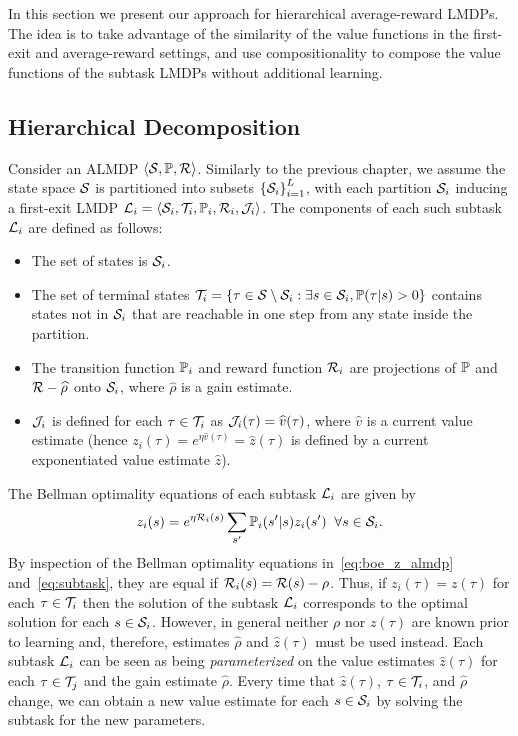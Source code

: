 In this section we present our approach for hierarchical average-reward LMDPs. The idea is to take advantage of the similarity of the value functions in the first-exit and average-reward settings, and use compositionality to compose the value functions of the subtask LMDPs without additional learning.

\subsection{Hierarchical Decomposition}
Consider an ALMDP $\langle\mathcal{S},\mathbb{P},\mathcal{R}\rangle$. Similarly to the previous chapter, we assume the state space $\mathcal{S}$ is partitioned into subsets $\left\{\mathcal{S}_i\right\}^L_{i=1}$, with each partition $\mathcal{S}_i$ inducing
a first-exit LMDP $\mathcal{L}_i = \langle\mathcal{S}_i, \mathcal{T}_i, \mathbb{P}_i, \mathcal{R}_i,\mathcal{J}_i\rangle$.
The components of each such subtask $\mathcal{L}_i$ are defined as follows:
\begin{itemize}
  \item The set of states is $\mathcal{S}_i$.
  \item The set of terminal states $\mathcal{T}_i=\{\tau\in\mathcal{S}\setminus\mathcal{S}_i: \exists s\in\mathcal{S}_i, \mathbb{P}(\tau|s)>0\}$ contains states not in $\mathcal{S}_i$ that are reachable in one step from any state inside the partition.
  \item The transition function $\mathbb{P}_i$ and reward function $\mathcal{R}_i$ are projections of $\mathbb{P}$ and $\mathcal{R}-\widehat\rho$ onto $\mathcal{S}_i$, where $\widehat\rho$ is a gain estimate.
  \item $\mathcal{J}_i$ is defined for each $\tau\in\mathcal{T}_i$ as $\mathcal{J}_i(\tau)=\widehat v(\tau)$, where $\widehat v$ is a current value estimate (hence $z_i(\tau)=e^{\eta\widehat v(\tau)} = \widehat z(\tau)$ is defined by a current exponentiated value estimate $\widehat z$).
\end{itemize}
The Bellman optimality equations of each subtask $\mathcal{L}_i$ are given by
\begin{equation}\label{eq:subtask}
  z_i(s) = e^{\eta \mathcal{R}_i(s)} \sum_{s'} \mathbb{P}_i(s'|s) z_i(s') \;\; \forall s\in\mathcal{S}_i.
\end{equation}
By inspection of the Bellman optimality equations in~\eqref{eq:boe_z_almdp} and~\eqref{eq:subtask}, they are equal if $\mathcal{R}_i(s)=\mathcal{R}(s)-\rho$. Thus, if $z_i(\tau)=z(\tau)$ for each $\tau\in\mathcal{T}_i$ then the solution of the subtask $\mathcal{L}_i$ corresponds to the optimal solution for each $s\in\mathcal{S}_i$. However, in general neither $\rho$ nor $z(\tau)$ are known prior to learning and, therefore, estimates $\widehat\rho$ and $\widehat z(\tau)$ must be used instead. Each subtask $\mathcal{L}_i$ can be seen as being {\it parameterized\/} on the value estimates $\widehat z(\tau)$ for each $\tau\in\mathcal{T}_j$ and the gain estimate $\widehat\rho$. Every time that $\widehat z(\tau)$, $\tau\in\mathcal{T}_i$, and $\widehat\rho$ change, we can obtain a new value estimate for each $s\in\mathcal{S}_i$ by solving the subtask for the new parameters.

